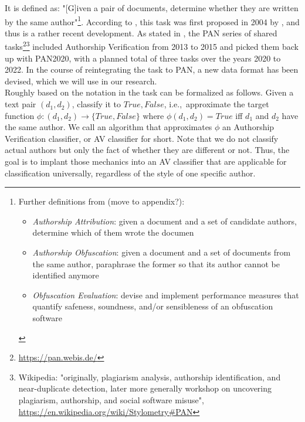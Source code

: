 It is defined as: "[G]iven a pair of documents, determine whether they are written by the same author"\footnote{
Further definitions from \cite{bevendorff2020shared} (move to appendix?):
\begin{itemize}
  \item \textit{Authorship Attribution}: given a document and a set of candidate authors, determine which of them wrote  the  documen
  \item \textit{Authorship Obfuscation}: given a document and a set of documents from the same author, paraphrase the former so that its author cannot be identified anymore
  \item \textit{Obfuscation Evaluation}: devise and implement performance measures that quantify safeness, soundness, and/or sensibleness of an obfuscation software
\end{itemize}
}.
According to \cite{stein2019unbiasedGutenbergCorpus}, this task was first proposed in 2004 by \cite{koppel2004unmasking}, and thus is a rather recent development.
As stated in \cite{bevendorff2020shared}, the PAN series of shared tasks\footnote{\url{https://pan.webis.de/}}\footnote{Wikipedia: "originally, plagiarism analysis, authorship identification, and near-duplicate detection, later more generally workshop on uncovering plagiarism, authorship, and social software misuse", \url{https://en.wikipedia.org/wiki/Stylometry\#PAN}} included Authorship Verification from 2013 to 2015 and picked them back up with PAN2020, with a planned total of three tasks over the years 2020 to 2022.
In the course of reintegrating the task to PAN, a new data format has been devised, which we will use in our research.\\
Roughly based on the notation in \cite{bevendorff2020shared} the task can be formalized as follows.
Given a text pair $(d_1, d_2)$, classify it to ${True, False}$, i.e.,\ approximate the target function $\phi{}:(d_1, d_2)\to\{True, False\}$ where $\phi(d_1, d_2)=True$ iff $d_1$ and $d_2$ have the same author.
We call an algorithm that approximates $\phi$ an Authorship Verification classifier, or AV classifier for short.
Note that we do not classify actual authors but only the fact of whether they are different or not.
Thus, the goal is to implant those mechanics into an AV classifier that are applicable for classification universally, regardless of the style of one specific author.

